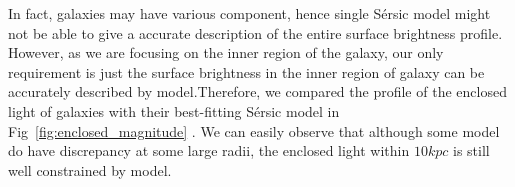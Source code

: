 \documentclass[fleqn,usenatbib]{mnras}
\begin{document}
\par In fact, galaxies may have various component, hence single S\'{e}rsic model might not be able to give a accurate description of the entire surface brightness profile. However, as we are focusing on the inner region of the galaxy, our only requirement is just the surface brightness in the inner region of galaxy can be accurately described by model.Therefore, we compared the profile of the enclosed light of galaxies with their best-fitting S\'{e}rsic model in Fig~\ref{fig:enclosed_magnitude} . We can easily observe that although some model do have discrepancy at some large radii, the enclosed light within $10kpc$ is still well constrained by model. 
\end{document}
